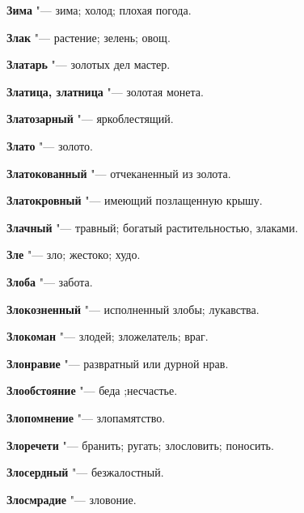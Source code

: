 \begin{mymulticols}{2}
\noindent\textbf{Зима} "--- зима; холод; плохая погода. 




\noindent\textbf{Злак} "--- растение; зелень; овощ. 




\noindent\textbf{Златарь} "--- золотых дел мастер. 




\noindent\textbf{Златица, златница} "--- золотая монета. 




\noindent\textbf{Златозарный} "--- яркоблестящий. 




\noindent\textbf{Злато} "--- золото. 




\noindent\textbf{Златокованный} "--- отчеканенный из золота. 




\noindent\textbf{Златокровный} "--- имеющий позлащенную крышу. 




\noindent\textbf{Злачный} "--- травный; богатый растительностью, злаками. 




\noindent\textbf{Зле} "--- зло; жестоко; худо. 




\noindent\textbf{Злоба} "--- забота. 




\noindent\textbf{Злокозненный} "--- исполненный злобы; лукавства. 




\noindent\textbf{Злокоман} "--- злодей; зложелатель; враг. 




\noindent\textbf{Злонравие} "--- развратный или дурной нрав. 




\noindent\textbf{Злообстояние} "--- беда ;несчастье. 




\noindent\textbf{Злопомнение} "--- злопамятство. 




\noindent\textbf{Злоречети} "--- бранить; ругать; злословить; поносить. 




\noindent\textbf{Злосердный} "--- безжалостный. 




\noindent\textbf{Злосмрадие} "--- зловоние. 





\end{mymulticols}
